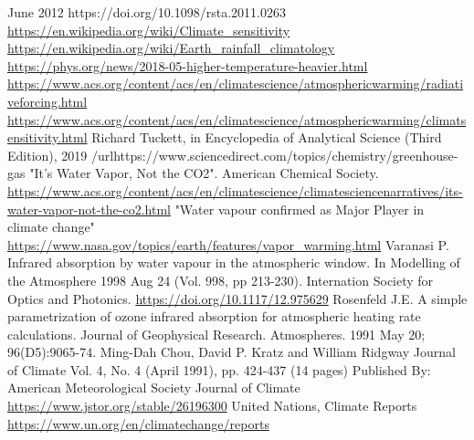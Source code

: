 \documentclass{book}
\begin{document}
\begin{thebibliography}{99}
		June 2012 https://doi.org/10.1098/rsta.2011.0263
			\url{https://en.wikipedia.org/wiki/Climate_sensitivity}
		 \url{https://en.wikipedia.org/wiki/Earth_rainfall_climatology}
		 \url{https://phys.org/news/2018-05-higher-temperature-heavier.html}
		 \url{https://www.acs.org/content/acs/en/climatescience/atmosphericwarming/radiativeforcing.html}
		 \url{https://www.acs.org/content/acs/en/climatescience/atmosphericwarming/climatsensitivity.html}
		 Richard Tuckett, in Encyclopedia of Analytical Science (Third Edition), 2019 /url{https://www.sciencedirect.com/topics/chemistry/greenhouse-gas}
		  "It's Water Vapor, Not the CO2". American Chemical Society. \url{https://www.acs.org/content/acs/en/climatescience/climatesciencenarratives/its-water-vapor-not-the-co2.html}
		  "Water vapour confirmed as Major Player in climate change" \url{https://www.nasa.gov/topics/earth/features/vapor_warming.html}
		 Varanasi P. Infrared absorption by water vapour in the atmospheric window. In Modelling of the Atmosphere 1998 Aug 24 (Vol. 998, pp 213-230). Internation Society for Optics and Photonics.
		\url{https://doi.org/10.1117/12.975629}
		 Rosenfeld J.E. A simple parametrization of ozone infrared absorption for atmospheric heating rate calculations. Journal of Geophysical Research. Atmospheres. 1991 May 20; 96(D5):9065-74.
		  Ming-Dah Chou, David P. Kratz and William Ridgway 
		Journal of Climate
		Vol. 4, No. 4 (April 1991), pp. 424-437 (14 pages)
		Published By: American Meteorological Society
		Journal of Climate    \url{https://www.jstor.org/stable/26196300}
		 United Nations, Climate Reports \url{https://www.un.org/en/climatechange/reports}
	\end{thebibliography}
	
\end{document}
